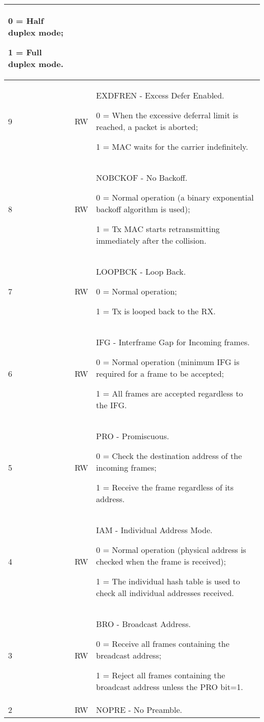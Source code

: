 \begin{table}[H]
\begin{tabularx}{\textwidth}{|l|l|X|}
                0 = Half duplex mode; 

                1 = Full duplex mode. \\ \hline
    9       & RW &  EXDFREN - Excess Defer Enabled. 

                0 = When the excessive deferral limit is reached, a packet is aborted; 

                1 = MAC waits for the carrier indefinitely. \\ \hline
    \rowcolor{iob-blue}
    8       & RW &  NOBCKOF - No Backoff. 

                0 = Normal operation (a binary exponential backoff algorithm is used); 

                1 = Tx MAC starts retransmitting immediately after the collision. \\ \hline
    7       & RW &  LOOPBCK - Loop Back. 

                0 = Normal operation; 

                1 = Tx is looped back to the RX. \\ \hline
    \rowcolor{iob-blue}
    6       & RW &  IFG - Interframe Gap for Incoming frames. 

                0 = Normal operation (minimum IFG is required for a frame to be accepted; 

                1 = All frames are accepted regardless to the IFG. \\ \hline
    5       & RW &  PRO - Promiscuous. 

                0 = Check the destination address of the incoming frames; 

                1 = Receive the frame regardless of its address. \\ \hline
    \rowcolor{iob-blue}
    4       & RW &   IAM - Individual Address Mode. 

                0 = Normal operation (physical address is checked when the frame is received); 

                1 = The individual hash table is used to check all individual addresses received. \\ \hline
    3       & RW &   BRO - Broadcast Address. 

                0 = Receive all frames containing the breadcast address; 

                1 = Reject all frames containing the broadcast address unless the PRO bit=1. \\ \hline
    \rowcolor{iob-blue}
    2       & RW &   NOPRE - No Preamble. 


\end{tabularx}
\end{table}
